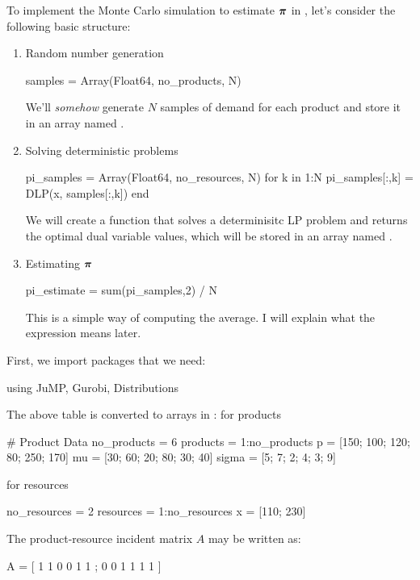 To implement the Monte Carlo simulation to estimate $\boldsymbol{\pi}$ in \julia{}, let's consider the following basic structure:
\begin{enumerate}
\item Random number generation
\begin{code}
samples = Array(Float64, no_products, N)
\end{code}
\noindent We'll \emph{somehow} generate $N$ samples of demand for each product and store it in an array named .

\item Solving deterministic problems
\begin{code}
pi_samples = Array(Float64, no_resources, N)
for k in 1:N
    pi_samples[:,k] = DLP(x, samples[:,k])
end
\end{code}
\noindent We will create a function  that solves a determinisitc LP problem and returns the optimal dual variable values, which will be stored in an array named .

\item Estimating $\boldsymbol{\pi}$
\begin{code}
pi_estimate = sum(pi_samples,2) / N
\end{code}
\noindent This is a simple way of computing the average. I will explain what the expression  means later.

\end{enumerate}


First, we import packages that we need:
\begin{code}
using JuMP, Gurobi, Distributions
\end{code}
\noindent The above table is converted to arrays in \julia{}: for products
\begin{code}
# Product Data
no_products = 6
products = 1:no_products
p = [150; 100; 120; 80; 250; 170]
mu = [30; 60; 20; 80; 30; 40]
sigma = [5; 7; 2; 4; 3; 9]
\end{code}
\noindent for resources
\begin{code}
no_resources = 2
resources = 1:no_resources
x = [110; 230]
\end{code}
\noindent The product-resource incident matrix $A$ may be written as:
\begin{code}
A = [ 1 1 0 0 1 1 ;
      0 0 1 1 1 1 ]
\end{code}

